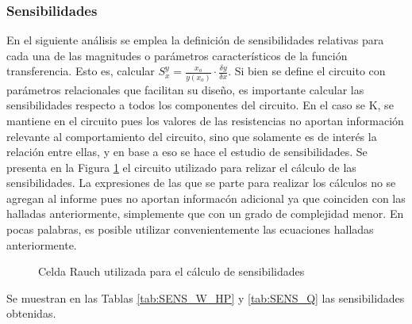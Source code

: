 \subsubsection{Sensibilidades}
En el siguiente an\'alisis se emplea la definici\'on de sensibilidades relativas para cada una de las magnitudes o par\'ametros caracter\'isticos de la funci\'on transferencia. Esto es,
calcular $S^{y}_x = \frac{x_o}{y(x_o)} \cdot \frac{\delta y}{\delta x}$.
Si bien se define el circuito con par\'ametros relacionales que facilitan su dise\~no, es importante calcular las sensibilidades respecto a todos los componentes del circuito. En el caso se K, se mantiene en el circuito pues los valores de las resistencias no aportan informaci\'on relevante al comportamiento del circuito, sino que solamente es de inter\'es la relaci\'on entre ellas, y en base a eso se hace el estudio de sensibilidades.
Se presenta en la Figura \ref{fig: CIRC_SENS} el circuito utilizado para relizar el c\'alculo de las sensibilidades. La expresiones de las que se parte para realizar los c\'alculos no se agregan al informe pues no aportan informac\'on adicional ya que coinciden con las halladas anteriormente, simplemente que con un grado de complejidad menor. En pocas palabras, es posible utilizar convenientemente las ecuaciones halladas anteriormente.\begin{figure}[H]
    \centering
    \caption{Celda Rauch utilizada para el c\'alculo de sensibilidades}
    \label{fig: CIRC_SENS}
\end{figure} 
Se muestran en las Tablas \ref{tab:SENS_W_HP} y \ref{tab:SENS_Q} las sensibilidades obtenidas.

